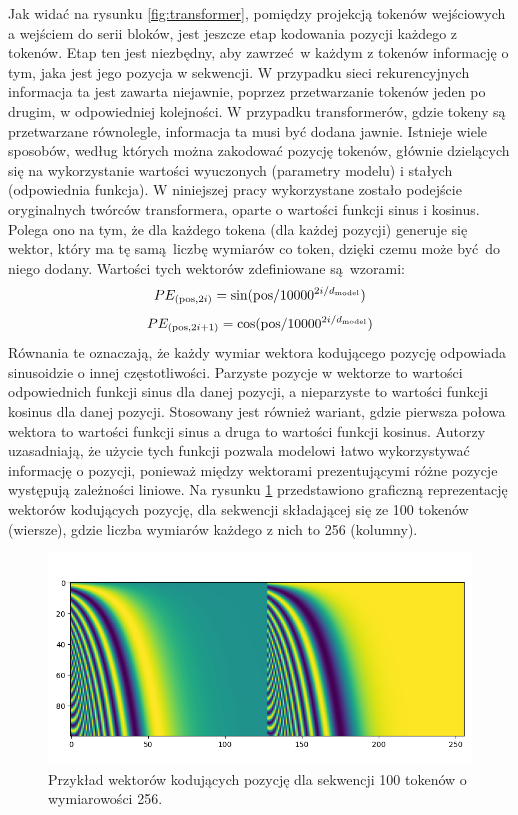 Jak widać na rysunku \ref{fig:transformer}, pomiędzy projekcją tokenów wejściowych a wejściem do serii bloków, jest jeszcze etap kodowania pozycji każdego z tokenów. Etap ten jest niezbędny, aby zawrzeć w każdym z tokenów informację o tym, jaka jest jego pozycja w sekwencji. W przypadku sieci rekurencyjnych informacja ta jest zawarta niejawnie, poprzez przetwarzanie tokenów jeden po drugim, w odpowiedniej kolejności. W przypadku transformerów, gdzie tokeny są przetwarzane równolegle, informacja ta musi być dodana jawnie.  Istnieje wiele sposobów, według których można zakodować pozycję tokenów, głównie dzielących się na wykorzystanie wartości wyuczonych (parametry modelu) i stałych (odpowiednia funkcja).  W niniejszej pracy wykorzystane zostało podejście oryginalnych twórców transformera, oparte o wartości funkcji sinus i kosinus. Polega ono na tym, że dla każdego tokena (dla każdej pozycji) generuje się wektor, który ma tę samą liczbę wymiarów co token, dzięki czemu może być do niego dodany. Wartości tych wektorów zdefiniowane są wzorami:
\begin{equation}
    PE_{(\textrm{pos},2i)} = \sin(\textrm{pos}/10000^{2i/d_{\textrm{\tiny model}}})
\end{equation}
\begin{equation}
PE_{(\textrm{pos},2i + 1)} = \cos(\textrm{pos}/10000^{2i/d_{\textrm{\tiny model}}})
\end{equation}
Równania te oznaczają, że każdy wymiar wektora kodującego pozycję odpowiada sinusoidzie o innej częstotliwości. Parzyste pozycje w wektorze to wartości odpowiednich funkcji sinus dla danej pozycji, a nieparzyste to wartości funkcji kosinus dla danej pozycji. Stosowany jest również wariant, gdzie pierwsza połowa wektora to wartości funkcji sinus a druga to wartości funkcji kosinus. Autorzy uzasadniają, że użycie tych funkcji pozwala modelowi łatwo wykorzystywać informację o pozycji, ponieważ między wektorami prezentującymi różne pozycje występują zależności liniowe. Na rysunku \ref{fig:positional_encoding} przedstawiono graficzną reprezentację wektorów kodujących pozycję, dla sekwencji składającej się ze 100 tokenów (wiersze), gdzie liczba wymiarów każdego z nich to 256 (kolumny).
\begin{figure}
    \centering
    \includegraphics[width=1.0\textwidth]{./images/positional_encoding.png}
    \caption{Przykład wektorów kodujących pozycję dla sekwencji 100 tokenów o wymiarowości 256.}
    \label{fig:positional_encoding}
\end{figure}

